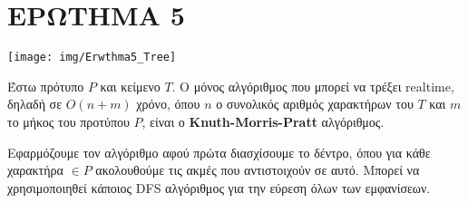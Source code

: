 \chapter{ΕΡΩΤΗΜΑ 5}
    \vspace{-10pt}
    \begin{center} \noindent
        \texttt{[image: img/Erwthma5\_Tree]}
    \end{center}

    Έστω πρότυπο \(P\) και κείμενο \(T\).
    Ο μόνος αλγόριθμος που μπορεί να τρέξει realtime, δηλαδή σε \(O(n+m)\) χρόνο, όπου \(n\) ο συνολικός αριθμός χαρακτήρων του \(T\)
        και \(m\) το μήκος του προτύπου \(P\), είναι ο \textbf{Knuth-Morris-Pratt} αλγόριθμος.

    Εφαρμόζουμε τον αλγόριθμο αφού πρώτα διασχίσουμε το δέντρο, όπου για κάθε χαρακτήρα \(\in P \) ακολουθούμε τις ακμές που αντιστοιχούν σε αυτό.
    Μπορεί να χρησιμοποιηθεί κάποιος DFS αλγόριθμος για την εύρεση όλων των εμφανίσεων.